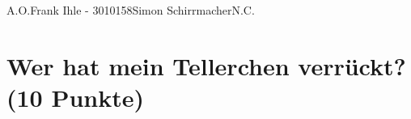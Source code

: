 \documentclass{ezb}
\begin{document}
          {A.O.}{Frank Ihle - 3010158}{Simon Schirrmacher}{N.C.}

\section{Wer hat mein Tellerchen verrückt? (10 Punkte)}

\newpage
\end{document}
